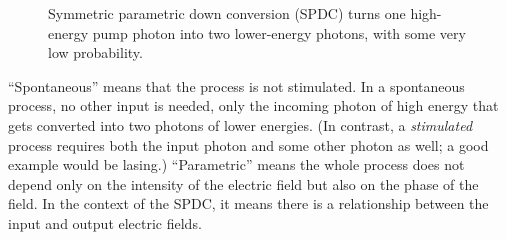 \begin{figure}[t]
    \centering
    \caption[Spontaneous parametric down conversion (SPDC).]{Symmetric parametric down conversion (SPDC) turns one high-energy pump photon into two lower-energy photons, with some very low probability.}
    \label{fig:spdc}
\end{figure}

``Spontaneous'' means that the process is not stimulated.
In a spontaneous process, no other input is needed, only the incoming photon of high energy that gets converted into two photons of lower energies.
(In contrast, a \emph{stimulated} process requires both the input photon and some other photon as well; a good example would be lasing.) “Parametric” means the whole process does not depend only on the intensity of the electric field but also on the phase of the field. In the context of the SPDC, it means there is a relationship between the input and output electric fields.

